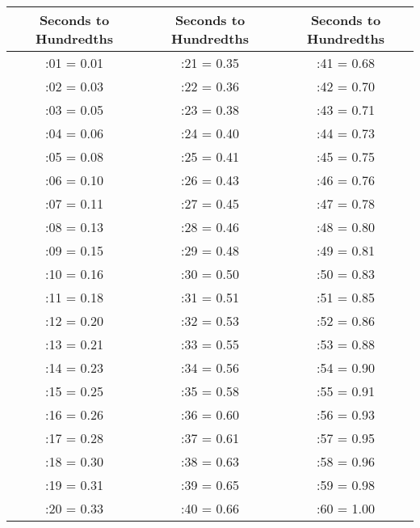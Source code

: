 \label{apdx:sec-to-hdth-conversion}
\begin{tabular}{ |c|c|c| }
  \hline
  {\tiny Seconds to Hundredths} & 
  {\tiny Seconds to Hundredths} & 
  {\tiny Seconds to Hundredths} \\
  \hline
  :01 = 0.01 & :21 = 0.35 & :41 = 0.68 \\
  :02 = 0.03 & :22 = 0.36 & :42 = 0.70 \\
  :03 = 0.05 & :23 = 0.38 & :43 = 0.71 \\
  :04 = 0.06 & :24 = 0.40 & :44 = 0.73 \\
  :05 = 0.08 & :25 = 0.41 & :45 = 0.75 \\
  \hline
  :06 = 0.10 & :26 = 0.43 & :46 = 0.76 \\
  :07 = 0.11 & :27 = 0.45 & :47 = 0.78 \\
  :08 = 0.13 & :28 = 0.46 & :48 = 0.80 \\
  :09 = 0.15 & :29 = 0.48 & :49 = 0.81 \\
  :10 = 0.16 & :30 = 0.50 & :50 = 0.83 \\
  \hline
  :11 = 0.18 & :31 = 0.51 & :51 = 0.85 \\
 :12 = 0.20 & :32 = 0.53 & :52 = 0.86 \\
 :13 = 0.21 & :33 = 0.55 & :53 = 0.88 \\
 :14 = 0.23 & :34 = 0.56 & :54 = 0.90 \\
 :15 = 0.25 & :35 = 0.58 & :55 = 0.91 \\
  \hline
  :16 = 0.26 & :36 = 0.60 & :56 = 0.93 \\
 :17 = 0.28 & :37 = 0.61 & :57 = 0.95 \\
 :18 = 0.30 & :38 = 0.63 & :58 = 0.96 \\
 :19 = 0.31 & :39 = 0.65 & :59 = 0.98 \\
 :20 = 0.33 & :40 = 0.66 & :60 = 1.00 \\
  \hline
\end{tabular}